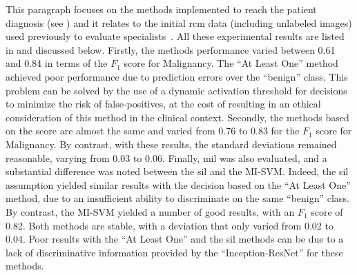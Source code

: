 \documentclass[journal,article,accept,moreauthors,pdftex, applsci]{Definitions/mdpi}
\newcommand{\fscore}{$F_{1}$ score}
\begin{document}
This paragraph focuses on the methods implemented to reach the patient diagnosis (see ) and it relates to the initial \ac{rcm} data (including unlabeled images) used previously to evaluate specialists~\cite{Cinotti2018}. All these experimental results are listed in  and discussed below. Firstly, the methods performance varied between 0.61 and 0.84 in terms of the \fscore{} for Malignancy. The “At Least One” method achieved poor performance due to prediction errors over the “benign” class. This problem can be solved by the use of a dynamic activation threshold for decisions to minimize the risk of false-positives, at the cost of resulting in an ethical consideration of this method in the clinical context. Secondly, the methods based on the score are almost the same and varied from 0.76 to 0.83 for the \fscore{} for Malignancy. By contrast, with these results, the standard deviations remained reasonable, varying from 0.03 to 0.06. Finally, \ac{mil} was also evaluated, and a substantial difference was noted between the \ac{sil} and the MI-SVM. Indeed, the \ac{sil} assumption yielded similar results with the decision based on the “At Least One” method, due to an insufficient ability to discriminate on the same “benign” class. By contrast, the MI-SVM yielded a number of good results, with an \fscore{} of 0.82. Both methods are stable, with a deviation that only varied from 0.02 to 0.04. Poor results with the “At Least One” and the \ac{sil} methods can be due to a lack of discriminative information provided by the “Inception-ResNet” for these methods.\par
\end{document}
